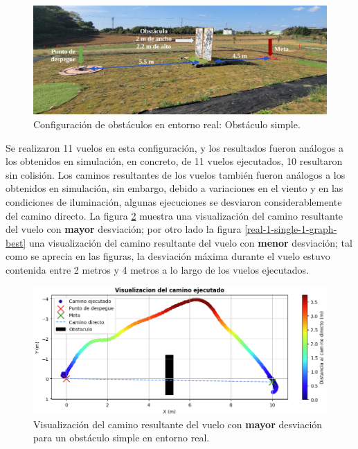 \begin{figure}[H]
    \centering
    \includegraphics[scale=0.22]{partes/ImgJoao/real-1-single-0-setup.png}
    \caption[Configuración de obstáculos en entorno real: Obstáculo simple]{Configuración de obstáculos en entorno real: Obstáculo simple.}
    \label{real-1-single-0-setup}
\end{figure}

Se realizaron 11 vuelos en esta configuración, y los resultados fueron análogos a los obtenidos en simulación, en concreto, de 11 vuelos ejecutados, 10 resultaron sin colisión. Los caminos resultantes de los vuelos también fueron análogos a los obtenidos en simulación, sin embargo, debido a variaciones en el viento y en las condiciones de iluminación, algunas ejecuciones se desviaron considerablemente del camino directo. La figura \ref{real-1-single-2-graph-worst} muestra una visualización del camino resultante del vuelo con \textbf{mayor} desviación; por otro lado la figura \ref{real-1-single-1-graph-best} una visualización del camino resultante del vuelo con \textbf{menor} desviación; tal como se aprecia en las figuras, la desviación máxima durante el vuelo estuvo contenida entre 2 metros y 4 metros a lo largo de los vuelos ejecutados.

\begin{figure}[H]
    \centering
    \includegraphics[scale=0.47]{partes/ImgJoao/real-1-single-2-graph-worst.png}
    \caption[Visualización del camino resultante del vuelo con mayor desviación para un obstáculo simple en entorno real.]{Visualización del camino resultante del vuelo con \textbf{mayor} desviación para un obstáculo simple en entorno real.}
    \label{real-1-single-2-graph-worst}
\end{figure}

